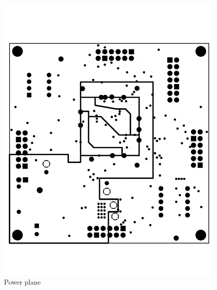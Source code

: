 \begin{appendices}
\begin{figure}[ptb]
	\begin{centering}
		\includegraphics[width=6in]{Appendices/Figures/appendices-layout_power.pdf}
		\caption{Power plane}
		\label{fig:appendices:layout_power}
	\end{centering}
\end{figure}


\end{appendices}
